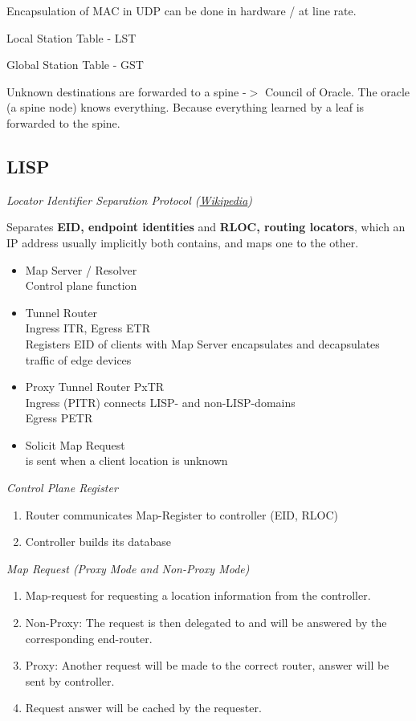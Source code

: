 Encapsulation of MAC in UDP can be done in hardware / at line rate.

Local Station Table - LST

Global Station Table - GST

Unknown destinations are forwarded to a spine -$>$ Council of Oracle. The oracle (a spine node) knows everything. Because everything learned by a leaf is forwarded to the spine.

\subsection{LISP}
\emph{Locator Identifier Separation Protocol 
(\href{https://de.wikipedia.org/wiki/Locator/Identifier_Separation_Protocol}{Wikipedia})}

\vspace{3mm}
\noindent
Separates \textbf{EID, endpoint identities} and \textbf{RLOC, routing locators}, which an IP address usually implicitly both contains, and maps one to the other.

\begin{itemize}
    \item Map Server / Resolver \\
        Control plane function 
    \item Tunnel Router \\
        Ingress ITR, Egress ETR \\
        Registers EID of clients with Map Server
        encapsulates and decapsulates traffic of edge devices
    \item Proxy Tunnel Router PxTR \\
        Ingress (PITR) connects LISP- and non-LISP-domains \\
        Egress PETR
    \item Solicit Map Request \\
        is sent when a client location is unknown
\end{itemize}

\noindent
\emph{Control Plane Register}
\begin{enumerate}
    \item Router communicates Map-Register to controller (EID, RLOC)
    \item Controller builds its database
\end{enumerate}

\vspace{3mm}
\noindent
\emph{Map Request (Proxy Mode and Non-Proxy Mode)}
\begin{enumerate}
    \item Map-request for requesting a location information from the controller. 
    \item Non-Proxy: The request is then delegated to and will be answered by the corresponding end-router.
    \item Proxy: Another request will be made to the correct router, answer will be sent by controller.
    \item Request answer will be cached by the requester.
\end{enumerate}

